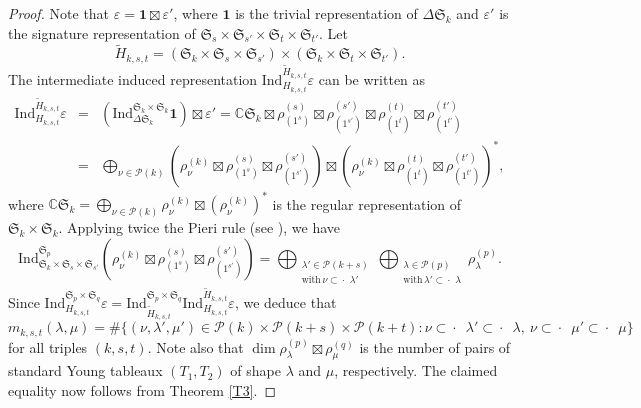 \documentclass[ALCO,Unicode]{cedram}
\newcommand{\card}[1]{\# #1}
\newcommand{\partitionsof}[1]{\mathcal{P}(#1)}
\newcommand{\permutationsof}[1]{\mathfrak{S}_{#1}}
\newcommand{\columnstrip}{\subset\!\!\!\!\!\cdot\,\,\,}
\newcommand{\smallcolumnstrip}{\subset\!\!\cdot\,\,}
\begin{document}
\begin{proof}
Note that $\varepsilon=\mathbf{1}\boxtimes\varepsilon'$, where $\mathbf{1}$ is the trivial representation of $\Delta\permutationsof{k}$ and $\varepsilon'$ is the signature representation of $\permutationsof{s}\times\permutationsof{s'}\times\permutationsof{t}\times\permutationsof{t'}$.
Let
\[
\tilde{H}_{k,s,t}=(\permutationsof{k}\times\permutationsof{s}\times \permutationsof{s'})\times
(\permutationsof{k}\times\permutationsof{t}\times \permutationsof{t'}).
\]
The intermediate induced representation $\mathrm{Ind}_{H_{k,s,t}}^{\tilde{H}_{k,s,t}}\varepsilon$ can be written as
\begin{eqnarray*}
\mathrm{Ind}_{H_{k,s,t}}^{\tilde{H}_{k,s,t}}\varepsilon
 & = & (\mathrm{Ind}_{\Delta\permutationsof{k}}^{\permutationsof{k}\times\permutationsof{k}}\mathbf{1})\boxtimes\varepsilon'
=\mathbb{C}\permutationsof{k}\boxtimes\rho_{(1^s)}^{(s)}\boxtimes\rho_{(1^{s'})}^{(s')}\boxtimes\rho_{(1^t)}^{(t)}\boxtimes\rho_{(1^{t'})}^{(t')}\\
 & = & \bigoplus_{\nu\in\partitionsof{k}}(\rho_\nu^{(k)}\boxtimes\rho_{(1^s)}^{(s)}\boxtimes\rho_{(1^{s'})}^{(s')})\boxtimes(\rho_\nu^{(k)}\boxtimes\rho_{(1^t)}^{(t)}\boxtimes\rho_{(1^{t'})}^{(t')})^*,
\end{eqnarray*}
where $\mathbb{C}\permutationsof{k}=\bigoplus_{\nu\in\partitionsof{k}}\rho_\nu^{(k)}\boxtimes(\rho_\nu^{(k)})^*$ is the regular representation of $\permutationsof{k}\times\permutationsof{k}$.
Applying twice the Pieri rule (see \cite[\S2.2 and \S7.3]{Fulton}), we have
\[\mathrm{Ind}_{\permutationsof{k}\times\permutationsof{s}\times\permutationsof{s'}}^{\permutationsof{p}}(\rho_\nu^{(k)}\boxtimes\rho_{(1^s)}^{(s)}\boxtimes\rho_{(1^{s'})}^{(s')})=
\bigoplus_{\substack{\lambda'\in\partitionsof{k+s}\\ \mathrm{with}\,\nu\smallcolumnstrip\lambda'}}\bigoplus_{\substack{\lambda\in\partitionsof{p}\\\mathrm{with}\,\lambda'\smallcolumnstrip\lambda}}\rho_\lambda^{(p)}.\]
Since $\mathrm{Ind}_{H_{k,s,t}}^{\permutationsof{p}\times\permutationsof{q}}\varepsilon=
\mathrm{Ind}_{\tilde{H}_{k,s,t}}^{\permutationsof{p}\times\permutationsof{q}}
\mathrm{Ind}_{H_{k,s,t}}^{\tilde{H}_{k,s,t}}\varepsilon$, we deduce that
\[
m_{k,s,t}(\lambda,\mu)=\card\{(\nu,\lambda',\mu')\in\partitionsof{k}\times\partitionsof{k+s}\times\partitionsof{k+t}:\nu\columnstrip\lambda'\columnstrip\lambda,\ \nu\columnstrip\mu'\columnstrip\mu\}
\]
for all triples $(k,s,t)$.
Note also that $\dim\rho_\lambda^{(p)}\boxtimes\rho_\mu^{(q)}$ is the number of pairs of standard Young tableaux $(T_1,T_2)$ of shape $\lambda$ and $\mu$, respectively.
The claimed equality now follows from Theorem \ref{T3}.
\end{proof}
\end{document}
